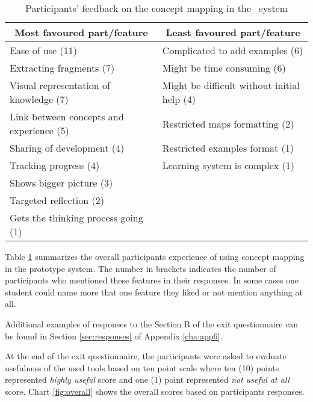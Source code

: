 \begin{table}[htb] \small
\setlength{\abovecaptionskip}{0pt}
  \caption{Participants' feedback on the concept mapping in the \ep~system }
  \begin{center}
    \begin{tabular}{| p{6.5cm} | p{6.5cm} |}
    \hline
     \multicolumn{1}{|c|}{\textbf{Most favoured part/feature}} &
     \multicolumn{1}{c|}{\textbf{Least favoured part/feature}} \\
     \hline
     Ease of use (11) & Complicated to add examples (6) \\ \hline
     Extracting fragments (7) & Might be time consuming (6) \\ \hline
     Visual representation of knowledge (7) & Might be difficult without initial help (4) \\ \hline
     Link between concepts and experience (5) & Restricted maps formatting (2) \\ \hline 
     Sharing of development (4) & Restricted examples format (1) \\ \hline
     Tracking progress (4) & Learning system is complex (1) \\ \hline
     Shows bigger picture (3) &  \\ \hline
     Targeted reflection (2) & \\ \hline
     Gets the thinking process going (1) & \\ \hline
    \end{tabular}
  \end{center}
  \label{tab:study2summary}
\end{table}

Table \ref{tab:study2summary} summarizes the overall participants experience of
using concept mapping in the prototype system. The number in brackets indicates
the number of participants who mentioned these features in their responses. In
some cases one student could name more that one feature they liked or not
mention anything at all.

Additional examples of responses to the Section B of the exit questionnaire can
be found in Section \ref{sec:responses} of Appendix \ref{cha:app6}.

At the end of the exit questionnaire, the participants were asked to evaluate
usefulness of the used tools based on ten point scale where ten (10) points
represented \textit{highly useful} score and one (1) point represented
\textit{not useful at all} score. Chart \ref{fig:overall} shows the overall
scores based on participants responses.

